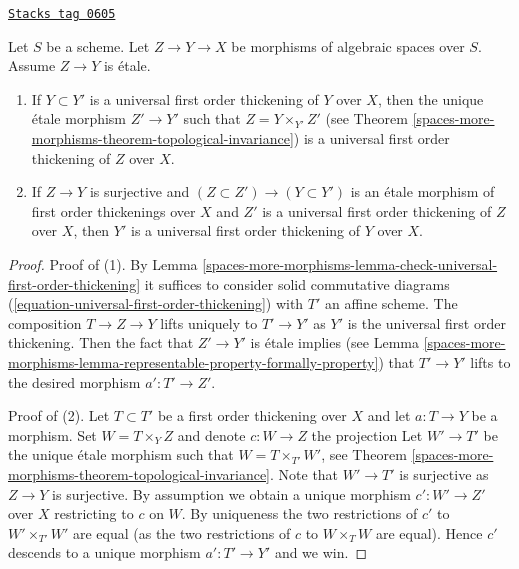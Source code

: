 \begin{lemma}
\label{spaces-more-morphisms-lemma-etale-morphism-of-universal-thickenings}
\href{https://stacks.math.columbia.edu/tag/0605}{\texttt{Stacks tag 0605}}

Let $S$ be a scheme.
Let $Z \to Y \to X$ be morphisms of algebraic spaces over $S$.
Assume $Z \to Y$ is \'etale.
\begin{enumerate}
\item If $Y \subset Y'$ is a universal first order thickening of
$Y$ over $X$, then the unique \'etale morphism $Z' \to Y'$ such
that $Z = Y \times_{Y'} Z'$ (see
Theorem \ref{spaces-more-morphisms-theorem-topological-invariance})
is a universal first order thickening of $Z$ over $X$.
\item If $Z \to Y$ is surjective and
$(Z \subset Z') \to (Y \subset Y')$ is an \'etale morphism
of first order thickenings over $X$ and $Z'$ is a universal first
order thickening of $Z$ over $X$, then $Y'$ is a universal first
order thickening of $Y$ over $X$.
\end{enumerate}
\end{lemma}

\begin{proof}
Proof of (1). By
Lemma \ref{spaces-more-morphisms-lemma-check-universal-first-order-thickening}
it suffices to consider solid commutative diagrams
(\ref{equation-universal-first-order-thickening})
with $T'$ an affine scheme. The composition
$T \to Z \to Y$ lifts uniquely to $T' \to Y'$ as $Y'$ is
the universal first order thickening. Then the fact that
$Z' \to Y'$ is \'etale implies (see
Lemma \ref{spaces-more-morphisms-lemma-representable-property-formally-property})
that $T' \to Y'$ lifts to the
desired morphism $a' : T' \to Z'$.

\medskip\noindent
Proof of (2). Let $T \subset T'$ be a first order thickening over
$X$ and let $a : T \to Y$ be a morphism. Set $W = T \times_Y Z$
and denote $c : W \to Z$ the projection
Let $W' \to T'$ be the unique \'etale morphism such that
$W = T \times_{T'} W'$, see
Theorem \ref{spaces-more-morphisms-theorem-topological-invariance}.
Note that $W' \to T'$ is surjective as $Z \to Y$ is surjective.
By assumption we obtain a unique morphism $c' : W' \to Z'$
over $X$ restricting to $c$ on $W$. By uniqueness the two restrictions
of $c'$ to $W' \times_{T'} W'$ are equal (as the two restrictions of
$c$ to $W \times_T W$ are equal). Hence $c'$ descends to a unique
morphism $a' : T' \to Y'$ and we win.
\end{proof}

